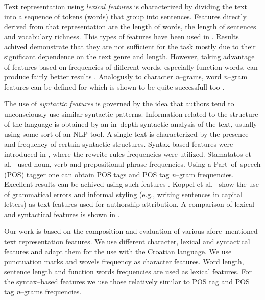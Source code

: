 \documentclass{llncs}
\begin{document}
Text representation using \emph{lexical features} is characterized by dividing
the text into a sequence of tokens (words) that group into sentences. Features
directly derived from that representation are the length of words, the
length of sentences and vocabulary richness. This types of features have been used in
\cite{mendenhall1887,holmes1994authorship} . Results achived demonstrate that
they are not sufficient for the task mostly due to their
significant dependence on the text genre and length. However, taking advantage of
features based on frequencies of different words, especially function words,
can produce fairly better results
\cite{argamon2005measuring,uzuner2005comparative,koppel2003exploiting,zhao2005effective}.
Analogusly to character \emph{n}--grams, word \emph{n}--gram features
can be defined for which is shown to be quite successfull too
\cite{keselj2003n,coyotl2006authorship}.

The use of \emph{syntactic features} is governed by the idea that authors tend to
unconsciously use similar syntactic patterns. Information related to the structure of
the language is obtained by an in--depth syntactic analysis of the text, usually
using some sort of an NLP tool. A single text is characterized by the presence
and frequency of certain syntactic structures. Syntax-based features were
introduced in \cite{van1996outside}, where the rewrite rules frequencies were
utilized. Stamatatos et al.\ \cite{stamatatos2001computer} used noun, verb and
prepositional phrase frequencies. Using a Part--of--speech (POS) tagger one can obtain POS tags and
POS tag \emph{n}--gram frequencies. Excellent results can be achived using such features
\cite{kukushkina2001using,koppel2003exploiting,diederich2003authorship,luyckx2005shallow}.
Koppel et al.\ \cite{koppel2003exploiting} show the use of grammatical errors
and informal styling (e.g., writing sentences in capital letters) as text features used for
authorship attribution. A comparison of lexical and syntactical features is shown
in \cite{uzuner2005comparative}. 

Our work is based on the composition and evaluation of various afore--mentioned
text representation features. We use different character, lexical and syntactical
features and adapt them for the use with the Croatian language. We use punctuation marks and 
wovels frequency as character features. Word length, sentence length and function words frequencies are used as lexical features.
For the syntax--based features we use those relatively similar to POS tag and POS
tag \emph{n}--grams frequencies.
\end{document}
